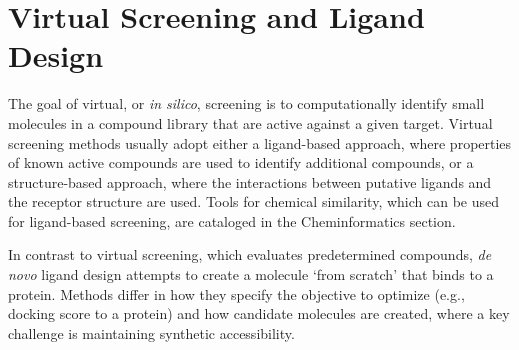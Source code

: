 \section{Virtual Screening and Ligand Design}

The goal of virtual, or \textit{in silico}, screening is to computationally identify small molecules in a compound library that are active against a given target.  Virtual screening methods usually adopt either a ligand-based approach, where properties of known active compounds are used to identify additional compounds, or a structure-based approach, where the interactions between putative ligands and the receptor structure are used.  Tools for chemical similarity, which can be used for ligand-based screening, are cataloged in the Cheminformatics section.

In contrast to virtual screening, which evaluates predetermined compounds, \textit{de novo} ligand design attempts to create a molecule `from scratch' that binds to a protein.  Methods differ in how they specify the objective to optimize (e.g., docking score to a protein) and how candidate molecules are created, where a key challenge is maintaining synthetic accessibility. 